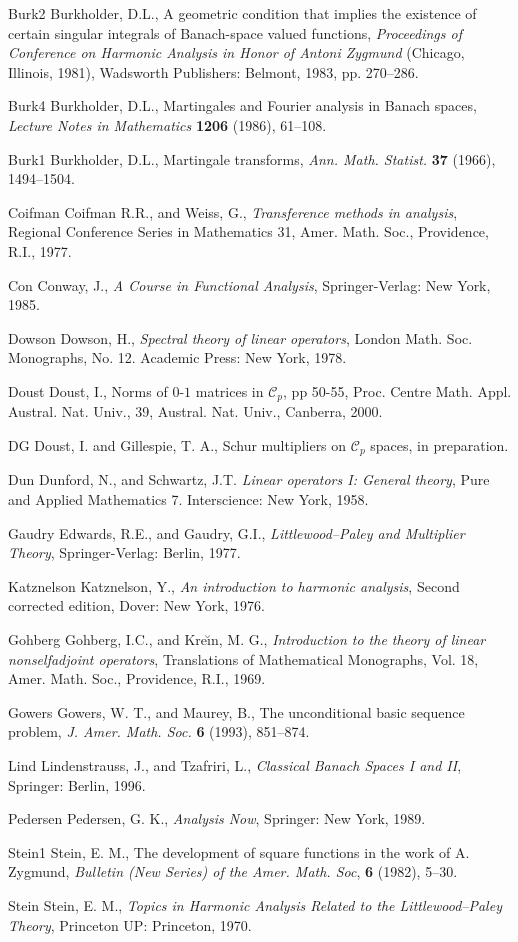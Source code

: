 \documentclass[honours,12pt]{unswthesis}
\newcommand{\CC}{\mathcal{C}}
\numberwithin{equation}{section}
\begin{document}
\begin{thebibliography}{999}
\bibitem
{Burk2} Burkholder, D.L.,
A geometric condition that implies the existence of certain singular integrals
of Banach-space valued functions,
\textit{Proceedings of Conference on Harmonic Analysis in Honor of Antoni
Zygmund} (Chicago, Illinois, 1981), Wadsworth Publishers: Belmont,
1983, pp. 270--286.

\bibitem
{Burk4} Burkholder, D.L.,
Martingales and Fourier analysis in Banach spaces,
\textit{Lecture Notes in Mathematics} \textbf{1206} (1986), 61--108.

\bibitem
{Burk1} Burkholder, D.L.,
Martingale transforms,
\textit{Ann. Math. Statist.} \textbf{37} (1966), 1494--1504.

\bibitem
{Coifman} Coifman R.R., and Weiss, G.,
\textit{Transference methods in analysis},
Regional Conference Series in Mathematics 31,
Amer. Math. Soc., Providence, R.I., 1977.

\bibitem
{Con} Conway, J.,
\textit{A Course in Functional Analysis},
Springer-Verlag: New York, 1985.

\bibitem
{Dowson} Dowson, H.,
\textit{Spectral theory of linear operators},
London Math. Soc. Monographs, No. 12. Academic Press: New York, 1978.

\bibitem
{Doust} 
Doust, I., Norms of $0$-$1$ matrices in $\CC_p$,  pp 50-55, Proc.
Centre Math. Appl. Austral. Nat. Univ., 39, Austral. Nat. Univ.,
Canberra, 2000.

\bibitem
{DG} Doust, I.  and Gillespie, T. A.,
Schur multipliers on $\CC_p$ spaces,
in preparation.

\bibitem
{Dun} Dunford, N., and Schwartz, J.T.
\textit{Linear operators I: General theory},
Pure and Applied Mathematics 7. Interscience: New York, 1958.

\bibitem
{Gaudry} Edwards, R.E., and Gaudry, G.I.,
\textit{Littlewood--Paley and Multiplier Theory},
Springer-Verlag: Berlin, 1977.

\bibitem
{Katznelson}
Katznelson, Y.,
\textit{An introduction to harmonic analysis},
Second corrected edition, Dover: New York, 1976.

\bibitem
{Gohberg}
Gohberg, I.C., and Kre\u{\i}n, M. G.,
\textit{Introduction to the theory of linear nonselfadjoint operators},
Translations of Mathematical Monographs, Vol. 18, Amer. Math. Soc.,
Providence, R.I., 1969.

\bibitem
{Gowers} Gowers, W. T., and Maurey, B.,
The unconditional basic sequence problem,
\textit{J. Amer. Math. Soc.} \textbf{6} (1993), 851--874.

\bibitem
{Lind}
Lindenstrauss, J., and Tzafriri, L.,
\textit{Classical Banach Spaces I and II},
Springer: Berlin, 1996.

\bibitem
{Pedersen}
Pedersen, G. K.,
\textit{Analysis Now},
Springer: New York, 1989.

\bibitem
{Stein1}
Stein, E. M.,
The development of square functions in the work of A. Zygmund,
\textit{Bulletin (New Series) of the Amer. Math. Soc},
\textbf{6} (1982), 5--30.

\bibitem
{Stein}
Stein, E. M.,
\textit{Topics in Harmonic Analysis Related to the Littlewood--Paley Theory},
Princeton UP: Princeton, 1970.

\end{thebibliography}
\end{document}
